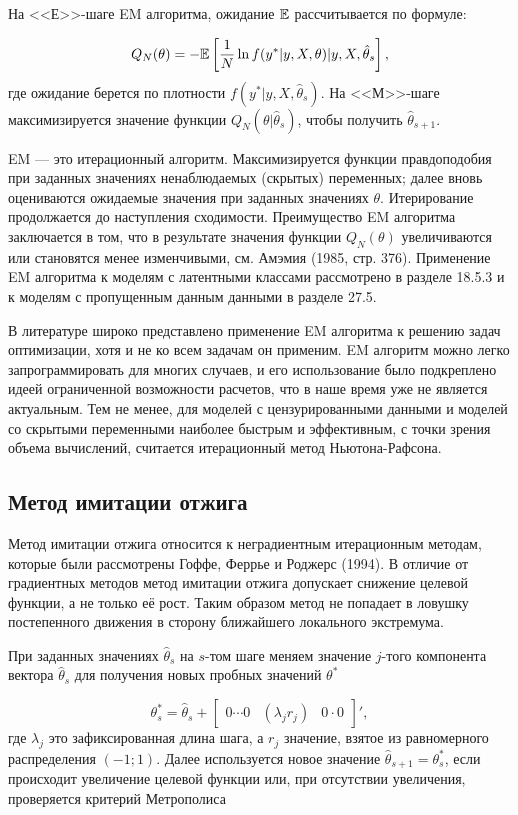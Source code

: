 На <<Е>>-шаге EM алгоритма, ожидание $\mathbb{E}$ рассчитывается по формуле:

\begin{equation}
Q_{N}(\theta)=-\mathbb{E}\left[\dfrac{1}{N} \ln f(y^{*}|y,X,\theta)|y,X,\hat{\theta}_s\right],
\end{equation}
где ожидание берется по плотности $f(y^{*}|y,X,\hat{\theta}_s)$. На <<М>>-шаге максимизируется значение функции $Q_{N}(\theta|\hat{\theta}_s)$, чтобы получить $\hat{\theta}_{s+1}$.

EM --- это итерационный алгоритм. Максимизируется функции правдоподобия при заданных значениях ненаблюдаемых (скрытых) переменных; далее вновь оцениваются ожидаемые значения при заданных значениях $\theta$. Итерирование продолжается до наступления сходимости. Преимущество EM алгоритма заключается в том, что в результате значения функции $Q_{N}(\theta)$ увеличиваются или становятся менее изменчивыми, см. Амэмия (1985, стр. 376). Применение EM алгоритма к моделям с латентными классами рассмотрено в разделе 18.5.3 и к моделям с пропущенным данным данными в разделе 27.5.

В литературе широко представлено применение EM алгоритма к решению задач оптимизации, хотя и не ко всем задачам он применим. EM алгоритм можно легко запрограммировать для многих случаев, и его использование было подкреплено идеей ограниченной возможности расчетов, что в наше время уже не является актуальным. Тем не менее, для моделей с цензурированными данными и моделей со скрытыми переменными наиболее быстрым и эффективным, с точки зрения объема вычислений, считается итерационный метод Ньютона-Рафсона.

\subsection{Метод имитации отжига}

Метод имитации отжига относится к неградиентным итерационным методам, которые были рассмотрены Гоффе, Феррье и Роджерс (1994). В отличие от градиентных методов метод имитации отжига допускает снижение целевой функции, а не только её рост. Таким образом метод не попадает в ловушку постепенного движения в сторону ближайшего локального экстремума.

При заданных значениях $\hat{\theta}_s$ на $s$-том шаге меняем значение $j$-того компонента вектора $\hat{\theta}_s$ для получения новых пробных значений $\theta^{*}$

\begin{equation}
\theta^{*}_{s}=\hat{\theta}_s+ \begin{bmatrix} 0 \cdots 0 & (\lambda_{j}r_{j}) & 0 \cdot 0 \end{bmatrix}',
\end{equation}
где $\lambda_j$ это зафиксированная длина шага, а $r_j$ значение, взятое из равномерного распределения $(-1;1)$. Далее используется новое значение $\hat{\theta}_{s+1}=\theta_s^{*}$, если происходит увеличение целевой функции или, при отсутствии увеличения, проверяется  критерий Метрополиса

